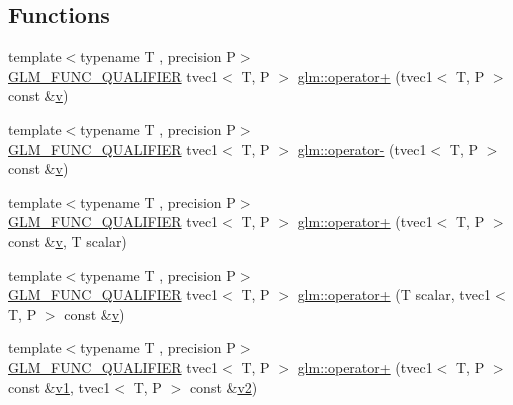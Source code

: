 \subsection*{Functions}
\begin{DoxyCompactItemize}
\item 
{\footnotesize template$<$typename T , precision P$>$ }\\\mbox{\hyperlink{setup_8hpp_a33fdea6f91c5f834105f7415e2a64407}{G\+L\+M\+\_\+\+F\+U\+N\+C\+\_\+\+Q\+U\+A\+L\+I\+F\+I\+ER}} tvec1$<$ T, P $>$ \mbox{\hyperlink{namespaceglm_ae4e916e7ac002004f4768efb4589dd5a}{glm\+::operator+}} (tvec1$<$ T, P $>$ const \&\mbox{\hyperlink{glad_8h_a14cfbe2fc2234f5504618905b69d1e06}{v}})
\item 
{\footnotesize template$<$typename T , precision P$>$ }\\\mbox{\hyperlink{setup_8hpp_a33fdea6f91c5f834105f7415e2a64407}{G\+L\+M\+\_\+\+F\+U\+N\+C\+\_\+\+Q\+U\+A\+L\+I\+F\+I\+ER}} tvec1$<$ T, P $>$ \mbox{\hyperlink{namespaceglm_ac3f9c05afa9b75ec6fdfe03148300a1d}{glm\+::operator-\/}} (tvec1$<$ T, P $>$ const \&\mbox{\hyperlink{glad_8h_a14cfbe2fc2234f5504618905b69d1e06}{v}})
\item 
{\footnotesize template$<$typename T , precision P$>$ }\\\mbox{\hyperlink{setup_8hpp_a33fdea6f91c5f834105f7415e2a64407}{G\+L\+M\+\_\+\+F\+U\+N\+C\+\_\+\+Q\+U\+A\+L\+I\+F\+I\+ER}} tvec1$<$ T, P $>$ \mbox{\hyperlink{namespaceglm_a1e29148fd52f9e292310bc4770efe6bb}{glm\+::operator+}} (tvec1$<$ T, P $>$ const \&\mbox{\hyperlink{glad_8h_a14cfbe2fc2234f5504618905b69d1e06}{v}}, T scalar)
\item 
{\footnotesize template$<$typename T , precision P$>$ }\\\mbox{\hyperlink{setup_8hpp_a33fdea6f91c5f834105f7415e2a64407}{G\+L\+M\+\_\+\+F\+U\+N\+C\+\_\+\+Q\+U\+A\+L\+I\+F\+I\+ER}} tvec1$<$ T, P $>$ \mbox{\hyperlink{namespaceglm_ac49a335c497b922d289c266abee1bfd3}{glm\+::operator+}} (T scalar, tvec1$<$ T, P $>$ const \&\mbox{\hyperlink{glad_8h_a14cfbe2fc2234f5504618905b69d1e06}{v}})
\item 
{\footnotesize template$<$typename T , precision P$>$ }\\\mbox{\hyperlink{setup_8hpp_a33fdea6f91c5f834105f7415e2a64407}{G\+L\+M\+\_\+\+F\+U\+N\+C\+\_\+\+Q\+U\+A\+L\+I\+F\+I\+ER}} tvec1$<$ T, P $>$ \mbox{\hyperlink{namespaceglm_ae381e4d867bba4a184aea9bb1dd4032f}{glm\+::operator+}} (tvec1$<$ T, P $>$ const \&\mbox{\hyperlink{glad_8h_a0779c3b73f9aa3a0ac5b0139b5d291d9}{v1}}, tvec1$<$ T, P $>$ const \&\mbox{\hyperlink{glad_8h_a9a09a1837922b2b806f4589096a52049}{v2}})

\end{DoxyCompactItemize}
